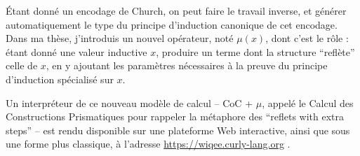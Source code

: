 \documentclass[]{easychair}
\begin{document}
Étant donné un encodage de Church, on peut faire le travail inverse, et
générer automatiquement le type du principe d'induction canonique de cet
encodage. Dans ma thèse, j'introduis un nouvel opérateur, noté
\(\mu(x)\), dont c'est le rôle : étant donné une valeur inductive \(x\),
produire un terme dont la structure ``reflète'' celle de \(x\), en y
ajoutant les paramètres nécessaires à la preuve du principe d'induction
spécialisé sur \(x\).

Un interpréteur de ce nouveau modèle de calcul -- CoC + \(\mu\), appelé
le Calcul des Constructions Prismatiques pour rappeler la métaphore des
``reflets with extra steps'' -- est rendu disponible sur une plateforme
Web interactive, ainsi que sous une forme plus classique, à l'adresse
\url{https://wiqee.curly-lang.org} .
\end{document}
